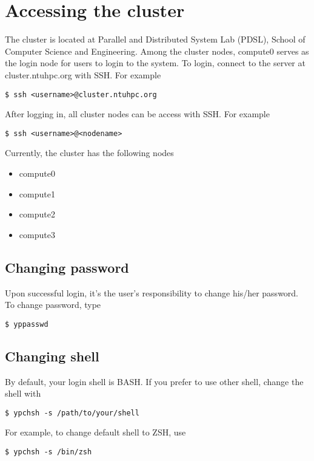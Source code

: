 \section{Accessing the cluster}

The cluster is located at Parallel and Distributed System Lab (PDSL), School of Computer Science and Engineering. Among the cluster nodes, compute0 serves as the login node for users to login to the system. To login, connect to the server at cluster.ntuhpc.org with SSH. For example

\begin{lstlisting}
$ ssh <username>@cluster.ntuhpc.org
\end{lstlisting}

\noindent After logging in, all cluster nodes can be access with SSH. For example

\begin{lstlisting}
$ ssh <username>@<nodename>
\end{lstlisting}

\noindent Currently, the cluster has the following nodes

\begin{itemize}
    \item compute0
    \item compute1
    \item compute2
    \item compute3
\end{itemize}

\subsection{Changing password}

Upon successful login, it's the user's responsibility to change his/her password. To change password, type

\begin{lstlisting}
$ yppasswd
\end{lstlisting}

\subsection{Changing shell}

By default, your login shell is BASH. If you prefer to use other shell, change the shell with

\begin{lstlisting}
$ ypchsh -s /path/to/your/shell
\end{lstlisting}

\noindent For example, to change default shell to ZSH, use

\begin{lstlisting}
$ ypchsh -s /bin/zsh
\end{lstlisting}